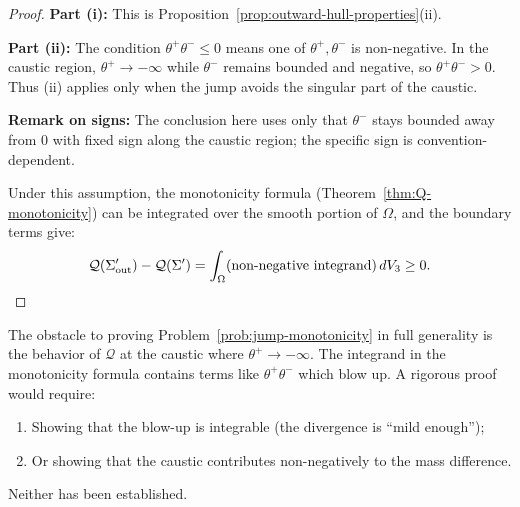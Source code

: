 \begin{proof}
\textbf{Part (i):} This is Proposition~\ref{prop:outward-hull-properties}(ii).

\textbf{Part (ii):} The condition $\theta^+\theta^- \leq 0$ means one of $\theta^+, \theta^-$ is non-negative. In the caustic region, $\theta^+ \to -\infty$ while $\theta^-$ remains bounded and negative, so $\theta^+\theta^- > 0$. Thus (ii) applies only when the jump avoids the singular part of the caustic.

\textbf{Remark on signs:} The conclusion here uses only that $\theta^-$ stays bounded away from $0$ with fixed sign along the caustic region; the specific sign is convention-dependent.

Under this assumption, the monotonicity formula (Theorem~\ref{thm:Q-monotonicity}) can be integrated over the smooth portion of $\Omega$, and the boundary terms give:
\begin{equation}
\mathcal{Q}(\Sigma'_{\mathrm{out}}) - \mathcal{Q}(\Sigma') = \int_\Omega (\text{non-negative integrand}) \, dV_3 \geq 0. \qedhere
\end{equation}
\end{proof}

\begin{remark}
The obstacle to proving Problem~\ref{prob:jump-monotonicity} in full generality is the behavior of $\mathcal{Q}$ at the caustic where $\theta^+ \to -\infty$. The integrand in the monotonicity formula contains terms like $\theta^+\theta^-$ which blow up. A rigorous proof would require:
\begin{enumerate}
\item Showing that the blow-up is integrable (the divergence is ``mild enough'');
\item Or showing that the caustic contributes non-negatively to the mass difference.
\end{enumerate}
Neither has been established.
\end{remark}

